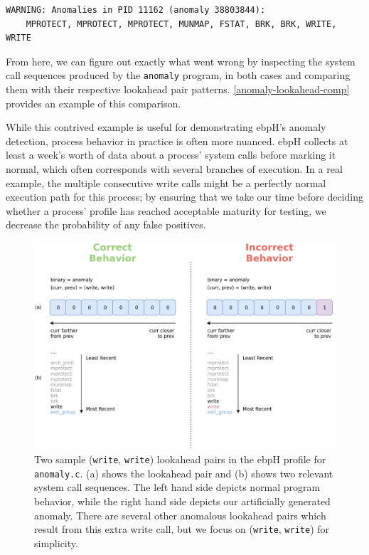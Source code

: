\documentclass[
  12pt]{findlay}
\begin{document}
\begin{lstlisting}[label={anomaly-flag}, caption={The flagged anomaly in the \texttt{anomaly}
binary as shown in the ebpH logs. Note that ebpH also logs the offending sequence, reordering it
so that most recent system calls appear on the right.}, language=none]
WARNING: Anomalies in PID 11162 (anomaly 38803844):
    MPROTECT, MPROTECT, MPROTECT, MUNMAP, FSTAT, BRK, BRK, WRITE, WRITE
\end{lstlisting}

From here, we can figure out exactly what went wrong by inspecting the
system call sequences produced by the \passthrough{\lstinline!anomaly!}
program, in both cases and comparing them with their respective
lookahead pair patterns. \autoref{anomaly-lookahead-comp} provides an
example of this comparison.

While this contrived example is useful for demonstrating ebpH's anomaly
detection, process behavior in practice is often more nuanced. ebpH
collects at least a week's worth of data about a process' system calls
before marking it normal, which often corresponds with several branches
of execution. In a real example, the multiple consecutive write calls
might be a perfectly normal execution path for this process; by ensuring
that we take our time before deciding whether a process' profile has
reached acceptable maturity for testing, we decrease the probability of
any false positives.

\begin{figure}
\begin{center}
\includegraphics[height=0.45\paperheight]{../figures/lookahead-anomaly.png}
\end{center}
\caption[Two sample (\lstinline{write}, \lstinline{write}) lookahead pairs in the ebpH profile for \lstinline{anomaly.c}.]
{
Two sample (\lstinline{write}, \lstinline{write}) lookahead pairs in the ebpH profile for \lstinline{anomaly.c}.
(a) shows the lookahead pair and (b) shows two relevant system call sequences. The left hand side depicts normal program
behavior, while the right hand side depicts our artificially generated anomaly.
There are several other anomalous lookahead pairs which result from this extra write call, but we focus
on (\lstinline{write}, \lstinline{write}) for simplicity.
}
\label{anomaly-lookahead-comp}
\end{figure}
\end{document}
